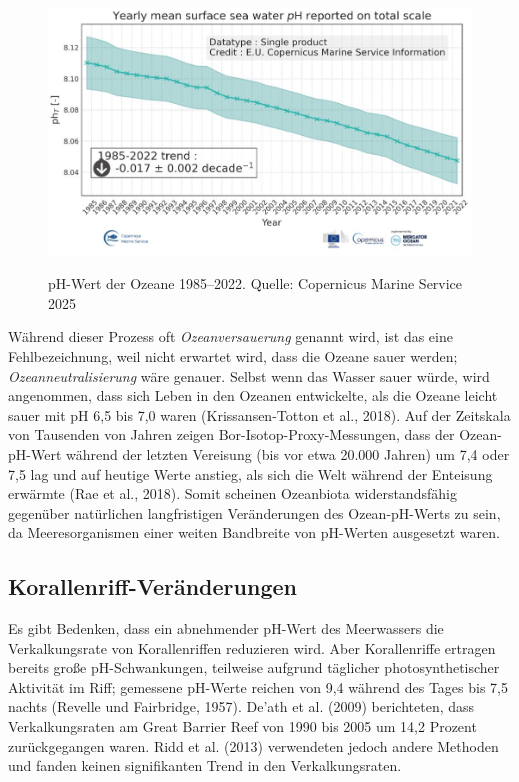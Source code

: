 \documentclass[12pt,paper=a4,DIV=12,parskip=never,chapterprefix=false,headings=standardclasses]{scrreprt}
\begin{document}
\begin{figure}[H]
\begin{center}
\includegraphics[width=1.0\textwidth]{bilder/bilderKlima-0004.jpg}\\[1cm]
\end{center}
\caption{pH-Wert der Ozeane 1985–2022. Quelle: Copernicus Marine Service 2025}
\end{figure}

Während dieser Prozess oft \emph{Ozeanversauerung} genannt wird, ist das eine Fehlbezeichnung, weil nicht erwartet wird, dass die Ozeane sauer werden; \emph{Ozeanneutralisierung} wäre genauer. Selbst wenn das Wasser sauer würde, wird angenommen, dass sich Leben in den Ozeanen entwickelte, als die Ozeane leicht sauer mit pH 6,5 bis 7,0 waren (Krissansen-Totton et al., 2018). Auf der Zeitskala von Tausenden von Jahren zeigen Bor-Isotop-Proxy-Messungen, dass der Ozean-pH-Wert während der letzten Vereisung (bis vor etwa 20.000 Jahren) um 7,4 oder 7,5 lag und auf heutige Werte anstieg, als sich die Welt während der Enteisung erwärmte (Rae et al., 2018). Somit scheinen Ozeanbiota widerstandsfähig gegenüber natürlichen langfristigen Veränderungen des Ozean-pH-Werts zu sein, da Meeresorganismen einer weiten Bandbreite von pH-Werten ausgesetzt waren.

\subsection{Korallenriff-Veränderungen}

Es gibt Bedenken, dass ein abnehmender pH-Wert des Meerwassers die Verkalkungsrate von Korallenriffen reduzieren wird. Aber Korallenriffe ertragen bereits große pH-Schwankungen, teilweise aufgrund täglicher photosynthetischer Aktivität im Riff; gemessene pH-Werte reichen von 9,4 während des Tages bis 7,5 nachts (Revelle und Fairbridge, 1957). De'ath et al. (2009) berichteten, dass Verkalkungsraten am Great Barrier Reef von 1990 bis 2005 um 14,2 Prozent zurückgegangen waren. Ridd et al. (2013) verwendeten jedoch andere Methoden und fanden keinen signifikanten Trend in den Verkalkungsraten.
\end{document}
